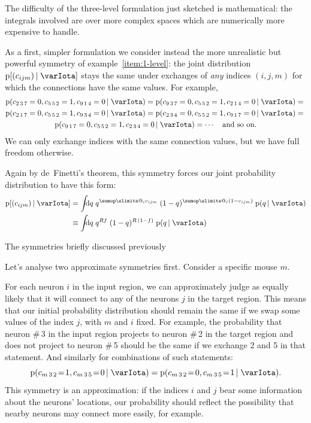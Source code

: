 \documentclass[\ifafour a4paper,12pt,\else a5paper,10pt,\fi%
onecolumn,oneside,article,%
british%
]{memoir}
\makeatletter
\theoremstyle{remark}
\theoremstyle{innote}
\def\sum{\DOTSI\sumop\slimits@}
\newcommand*{\di}{\mathrm{d}}%
\newcommand*{\pf}{\mathrm{p}}%
\renewcommand*{\|}[1][]{\nonscript\,#1\vert\nonscript\;\mathopen{}}
\newcommand*{\yI}{\varIota}
\newcommand*{\yc}{c}
\newcommand*{\eq}{\mathrel{\!=\!}}
\makeatother
\begin{document}
\bigskip

The difficulty of the three-level formulation just sketched is
mathematical: the integrals involved are over more complex spaces which are
numerically more expensive to handle.

As a first, simpler formulation we consider instead the more unrealistic
but powerful symmetry of example~\ref{item:1-level}: the joint distribution
$\pf[(\yc_{ijm}) \| \yI]$ stays the same under exchanges of \emph{any}
indices $(i,j,m)$ for which the connections have the same values. For example,
\begin{multline}
  \label{eq:example_exchange_i}
  \pf(\yc_{2\,3\,7}=0, \yc_{5\,5\,2}=1, \yc_{9\,1\,4}=0 \| \yI) =
  \pf(\yc_{9\,3\,7}=0, \yc_{5\,5\,2}=1, \yc_{2\,1\,4}=0 \| \yI) ={}\\
  \pf(\yc_{2\,1\,7}=0, \yc_{5\,5\,2}=1, \yc_{9\,3\,4}=0 \| \yI) =
  \pf(\yc_{2\,3\,4}=0, \yc_{5\,5\,2}=1, \yc_{9\,1\,7}=0 \| \yI) ={}\\
  \pf(\yc_{9\,1\,7}=0, \yc_{5\,5\,2}=1, \yc_{2\,3\,4}=0 \| \yI) =
  \dotsb\quad\text{and so on.}
\end{multline}
We can only exchange indices with the same connection values, but
we have full freedom otherwise.

Again by de~Finetti's theorem, this symmetry forces our joint probability
distribution to have this form:
\begin{equation}
  \label{eq:definetti_1level}
  \begin{split}
  \pf[(\yc_{ijm}) \| \yI] &=
  \int\!\!\!\di q\;
  q^{\sum_{i}\yc_{ijm}}\;(1-q)^{\sum_{i}(1-\yc_{ijm})}\;
  \pf(q \| \yI)
\\ &\equiv
  \int\!\!\!\di q\;
  q^{R f}\;(1-q)^{R\,(1-f)}\;
  \pf(q \| \yI)
\end{split}
\end{equation}




The symmetries briefly discussed previously

Let's analyse two approximate symmetries first. Consider a specific mouse
$m$.

For each neuron $i$ in the input region, we can approximately judge as
equally likely that it will connect to any of the neurons $j$ in the target
region. This means that our initial probability distribution should remain
the same if we swap some values of the index $j$, with $m$ and $i$ fixed.
For example, the probability that neuron \#\,3 in the input region projects
to neuron \#\,2 in the target region and does not project to neuron \#\,5
should be the same if we exchange 2 and 5 in that statement. And similarly
for combinations of such statements:
\begin{equation}
  \label{eq:example_exch_j}
  \pf(\yc_{m\,3\,2} \eq 1, \yc_{m\,3\,5} \eq 0 \| \yI )
=  \pf(\yc_{m\,3\,2} \eq 0, \yc_{m\,3\,5} \eq 1 \| \yI ).
\end{equation}
This symmetry is an approximation: if the indices $i$ and $j$ bear some
information about the neurons' locations, our probability should reflect
the possibility that nearby neurons may connect more easily, for example.
\end{document}
